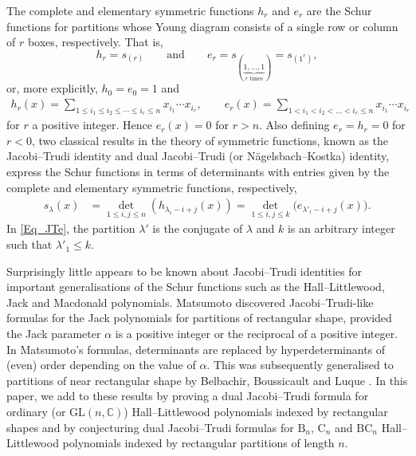 \documentclass[pdftex]{sigma}
\numberwithin{equation}{section}
\renewcommand{\leq}{\leqslant}
\newcommand{\la}{\lambda}
\begin{document}
The complete and elementary symmetric functions $h_r$ and $e_r$
are the Schur functions for partitions whose Young diagram consists of
a single row or column of $r$ boxes, respectively.
That is,
\[
h_r=s_{(r)} \qquad \text{and}\qquad
e_r=s_{(\!\underbrace{\scriptstyle{1,\dots,1}}_{r \text{ times}}\!)}=s_{(1^r)},
\]
or, more explicitly,
$h_0=e_0=1$ and
\begin{align*}
 h_r(x)=\sum_{1\leq i_1\leq i_2\leq \cdots \leq i_r\leq n}
x_{i_1}\cdots x_{i_r},\qquad
 e_r(x)=\sum_{1<i_1<i_2<\dots<i_r\leq n}
x_{i_1}\cdots x_{i_r}
\end{align*}
for $r$ a positive integer.
Hence $e_r(x)=0$ for $r>n$.
Also defining $e_r=h_r=0$ for $r<0$, two classical results in
the theory of symmetric functions, known as the Jacobi--Trudi
identity and dual Jacobi--Trudi (or N\"{a}gelsbach--Kostka) identity,
express the Schur functions in terms of determinants
with entries given by the complete and elementary symmetric functions,
respectively,
\begin{align}%
s_{\la}(x)&=\det_{1\leq i,j\leq n} (h_{\la_i-i+j}(x) )
 =\det_{1\leq i,j\leq k} \bigl(e_{\la'_i-i+j}(x)\bigr).
\label{Eq_JTe}
\end{align}
In \eqref{Eq_JTe}, the partition $\la'$ is the conjugate of $\la$ and
$k$ is an arbitrary integer such that $\la'_1\leq k$.

Surprisingly little appears to be known about Jacobi--Trudi identities
for important generalisations of the Schur functions such as the
Hall--Littlewood, Jack and Macdonald polynomials.
Matsumoto \cite[Theorem 5.1]{Matsumoto08} discovered
Jacobi--Trudi-like formulas for the Jack polynomials
for partitions of rectangular shape, provided the Jack parameter
$\alpha$ is a positive integer or the reciprocal
of a positive integer.
In Matsumoto's formulas, determinants are replaced by hyperdeterminants
of (even) order depending on the value of $\alpha$.
This was subsequently generalised to partitions of near rectangular
shape by Belbachir, Boussicault and Luque \cite{BBL08}.
In this paper, we add to these results by proving a
dual Jacobi--Trudi formula for ordinary (or $\mathrm{GL}(n,\mathbb{C})$)
Hall--Littlewood polynomials indexed by rectangular shapes
and by conjecturing dual Jacobi--Trudi formulas
for $\mathrm{B}_n$, $\mathrm{C}_n$ and $\mathrm{BC}_n$
Hall--Littlewood polynomials indexed by rectangular
partitions of length $n$.
\end{document}
